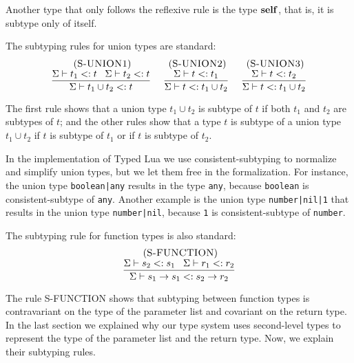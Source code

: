 Another type that only follows the reflexive rule is the type $\mathbf{self}$,
that is, it is subtype only of itself.

The subtyping rules for union types are standard:
\[
\begin{array}{c}
\begin{array}{c}
\; (\textsc{S-UNION1})\\
\dfrac{\Sigma \vdash t_{1} <: t \;\;\;
       \Sigma \vdash t_{2} <: t}
      {\Sigma \vdash t_{1} \cup t_{2} <: t}
\end{array}
\;
\begin{array}{c}
\; (\textsc{S-UNION2})\\
\dfrac{\Sigma \vdash t <: t_{1}}
      {\Sigma \vdash t <: t_{1} \cup t_{2}}
\end{array}
\;
\begin{array}{c}
\; (\textsc{S-UNION3})\\
\dfrac{\Sigma \vdash t <: t_{2}}
      {\Sigma \vdash t <: t_{1} \cup t_{2}}
\end{array}
\end{array}
\]

The first rule shows that a union type $t_{1} \cup t_{2}$
is subtype of $t$ if both $t_{1}$ and $t_{2}$ are subtypes
of $t$;
and the other rules show that a type $t$ is subtype
of a union type $t_{1} \cup t_{2}$ if $t$ is subtype of
$t_{1}$ or if $t$ is subtype of $t_{2}$.

In the implementation of Typed Lua we use consistent-subtyping to
normalize and simplify union types, but we let them free in the
formalization.
For instance, the union type \texttt{boolean|any} results in the
type \texttt{any}, because \texttt{boolean} is consistent-subtype
of \texttt{any}.
Another example is the union type \texttt{number|nil|1} that
results in the union type \texttt{number|nil}, because
\texttt{1} is consistent-subtype of \texttt{number}.

The subtyping rule for function types is also standard:
\[
\begin{array}{c}
\; (\textsc{S-FUNCTION})\\
\dfrac{\Sigma \vdash s_{2} <: s_{1} \;\;\;
       \Sigma \vdash r_{1} <: r_{2}}
      {\Sigma \vdash s_{1} \rightarrow s_{1} <: s_{2} \rightarrow r_{2}}
\end{array}
\]

The rule \textsc{S-FUNCTION} shows that subtyping between
function types is contravariant on the type of the parameter list
and covariant on the return type.
In the last section we explained why our type system uses
second-level types to represent the type of the parameter list
and the return type.
Now, we explain their subtyping rules.

